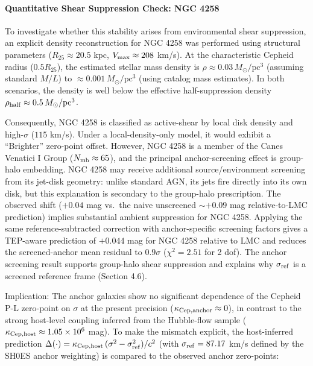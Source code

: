 \documentclass[
]{article}
\begin{document}
\paragraph{Quantitative Shear Suppression Check: NGC
4258}\label{quantitative-shear-suppression-check-ngc-4258}

To investigate whether this stability arises from environmental shear
suppression, an explicit density reconstruction for NGC 4258 was
performed using structural parameters (\(R_{25} \approx 20.5\) kpc,
\(V_{\rm max} \approx 208\) km/s). At the characteristic Cepheid radius
(\(0.5 R_{25}\)), the estimated stellar mass density is
\(\rho \approx 0.03
\, M_\odot/\text{pc}^3\) (assuming standard \(M/L\)) to
\(\approx 0.001 \,
M_\odot/\text{pc}^3\) (using catalog mass estimates). In both scenarios,
the density is well below the effective half-suppression density
\(\rho_{\rm half} \approx 0.5 \, M_\odot/\text{pc}^3\).

Consequently, NGC 4258 is classified as active-shear by local disk
density and high-\(\sigma\) (\(115\) km/s). Under a local-density-only
model, it would exhibit a ``Brighter'' zero-point offset. However, NGC
4258 is a member of the Canes Venatici I Group
(\(N_{\rm mb} \approx 65\)), and the principal anchor-screening effect
is group-halo embedding. NGC 4258 may receive additional
source/environment screening from its jet-disk geometry: unlike standard
AGN, its jets fire directly into its own disk, but this explanation is
secondary to the group-halo prescription. The observed shift (\(+0.04\)
mag vs.~the naive unscreened \(\sim+0.09\) mag relative-to-LMC
prediction) implies substantial ambient suppression for NGC 4258.
Applying the same reference-subtracted correction with anchor-specific
screening factors gives a TEP-aware prediction of \(+0.044\) mag for NGC
4258 relative to LMC and reduces the screened-anchor mean residual to
\(0.9\sigma\) (\(\chi^2=2.51\) for 2 dof). The anchor screening result
supports group-halo shear suppression and explains why
\(\sigma_{\rm ref}\) is a screened reference frame (Section 4.6).

Implication: The anchor galaxies show no significant dependence of the
Cepheid P-L zero-point on \(\sigma\) at the present precision
(\(\kappa_{\rm Cep, anchor} \approx 0\)), in contrast to the strong
host-level coupling inferred from the Hubble-flow sample
(\(\kappa_{\rm Cep, host} \approx 1.05\times10^6\) mag). To make the
mismatch explicit, the host-inferred prediction \(\Delta(\cdot) =
\kappa_{\rm Cep, host}\,(\sigma^2-\sigma_{\rm ref}^2)/c^2\) (with
\(\sigma_{\rm ref}=87.17\) km/s defined by the SH0ES anchor weighting)
is compared to the observed anchor zero-points:
\end{document}

